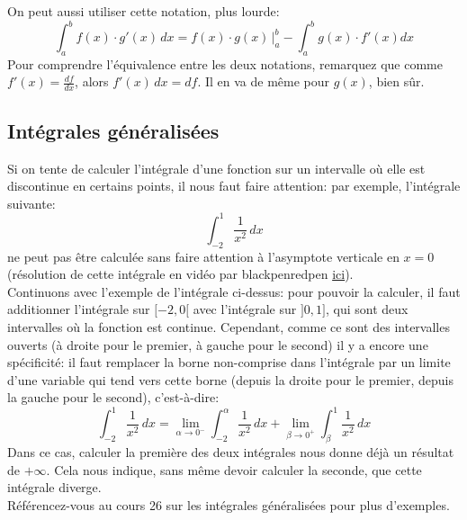 \documentclass{article}
\begin{document}
On peut aussi utiliser cette notation, plus lourde:
\begin{equation*}
	\int_a^b f(x) \cdot g'(x) \, dx = f(x) \cdot g(x) \, \bigg|_a^b - \int_a^b g(x) \cdot f'(x) dx
\end{equation*}
Pour comprendre l'équivalence entre les deux notations, remarquez que comme \(f'(x) = \tfrac{df}{dx}\), alors \(f'(x) \, dx = df\). Il en va de même pour \(g(x)\), bien sûr.

\subsection{Intégrales généralisées}
Si on tente de calculer l'intégrale d'une fonction sur un intervalle où elle est discontinue en certains points, il nous faut faire attention: par exemple, l'intégrale suivante:
\begin{equation*}
	\int_{-2}^1 \dfrac{1}{x^2} \, dx
\end{equation*}
ne peut pas être calculée sans faire attention à l'asymptote verticale en \(x = 0\) (résolution de cette intégrale en vidéo par blackpenredpen \href{https://www.youtube.com/watch?v=bEWIdRu4ctM}{ici}). \\

Continuons avec l'exemple de l'intégrale ci-dessus: pour pouvoir la calculer, il faut additionner l'intégrale sur \([-2, 0[\) avec l'intégrale sur \(]0, 1]\), qui sont deux intervalles où la fonction est continue. Cependant, comme ce sont des intervalles ouverts (à droite pour le premier, à gauche pour le second) il y a encore une spécificité: il faut remplacer la borne non-comprise dans l'intégrale par un limite d'une variable qui tend vers cette borne (depuis la droite pour le premier, depuis la gauche pour le second), c'est-à-dire:
\begin{equation*}
	\int_{-2}^1 \dfrac{1}{x^2} \, dx = \lim_{\alpha \to 0^-} \int_{-2}^{\alpha} \dfrac{1}{x^2} \, dx + \lim_{\beta \to 0^+} \int_{\beta}^1 \dfrac{1}{x^2} \, dx
\end{equation*}
Dans ce cas, calculer la première des deux intégrales nous donne déjà un résultat de \(+\infty\). Cela nous indique, sans même devoir calculer la seconde, que cette intégrale diverge. \\

Référencez-vous au cours 26 sur les intégrales généralisées pour plus d'exemples.

\end{document}
